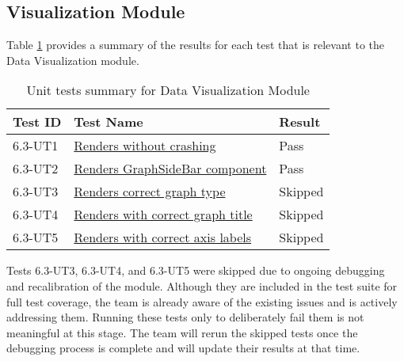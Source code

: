 \documentclass[12pt, titlepage]{article}
\begin{document}
\subsection{Visualization Module}
Table \ref{UT:VM} provides a summary of the results for each test that is
relevant to the Data Visualization module.

\begin{table}[H]
  \centering
  \begin{tabular}{|l|l|l|}
    \hline
    \textbf{Test ID} & \textbf{Test Name} & \textbf{Result}\\
    \hline
    6.3-UT1 &
    \href{https://github.com/SumanyaG/Alkalytics/blob/main/src/frontend/test/visualize/visualize.test.tsx}{Renders
    without crashing} & Pass \\
    \hline
    6.3-UT2 &
    \href{https://github.com/SumanyaG/Alkalytics/blob/main/src/frontend/test/visualize/visualize.test.tsx}{Renders
    GraphSideBar component} & Pass \\
    \hline
    6.3-UT3 &
    \href{https://github.com/SumanyaG/Alkalytics/blob/main/src/frontend/test/visualize/visualize.test.tsx}{Renders
    correct graph type} & Skipped \\
    \hline
    6.3-UT4 &
    \href{https://github.com/SumanyaG/Alkalytics/blob/main/src/frontend/test/visualize/visualize.test.tsx}{Renders
    with correct graph title} & Skipped \\
    \hline
    6.3-UT5 &
    \href{https://github.com/SumanyaG/Alkalytics/blob/main/src/frontend/test/visualize/visualize.test.tsx}{Renders
    with correct axis labels} & Skipped \\
    \hline
  \end{tabular}
  \caption{Unit tests summary for Data Visualization Module}
  \label{UT:VM}
\end{table}

Tests 6.3-UT3, 6.3-UT4, and 6.3-UT5 were skipped due to ongoing debugging and
recalibration of the module. Although they are included in the test suite for
full test coverage, the team is already aware of the existing issues and is
actively addressing them. Running these tests only to deliberately fail them is
not meaningful at this stage. The team will rerun the skipped tests once the
debugging process is complete and will update their results at that time.
\end{document}
